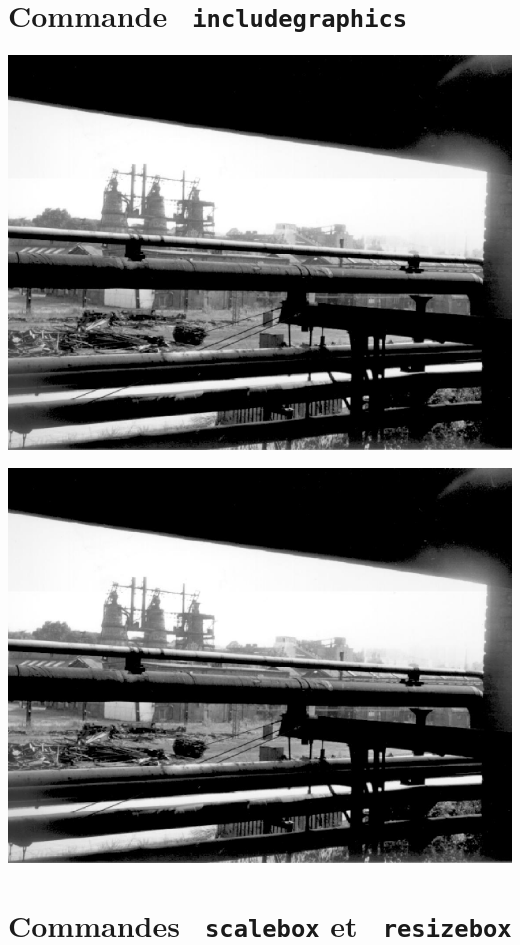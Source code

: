 \documentclass{article}
\begin{document}
\section{Commande \texttt{ includegraphics}}
\begin{center}
\includegraphics{HF.ps}
\end{center}


\includegraphics*[1cm,1cm]{HF.ps}


\section{Commandes \texttt{ scalebox} et \texttt{ resizebox}}
\end{document}
